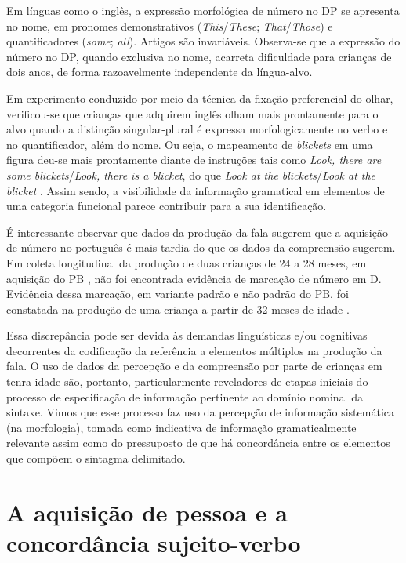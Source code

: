 \documentclass[output=paper]{LSP/langsci}
\begin{document}
Em línguas como o inglês, a expressão morfológica de número no DP se apresenta no nome, em pronomes demonstrativos (\textit{This}/\textit{These}; \textit{That}/\textit{Those}) e quantificadores (\textit{some}; \textit{all}). Artigos são invariáveis.  Observa-se que a expressão do número no DP, quando exclusiva no nome, acarreta dificuldade para crianças de dois anos, de forma razoavelmente independente da língua-alvo. 

Em experimento conduzido por meio da técnica da fixação preferencial do olhar, verificou-se que crianças que adquirem inglês olham mais prontamente para o alvo quando a distinção singular-plural é expressa morfologicamente no verbo e no quantificador, além do nome. Ou seja, o mapeamento de \textit{blickets} em uma figura deu-se mais prontamente diante de instruções tais como \textit{Look, there are some blickets}/\textit{Look, there is a blicket}, do que \textit{Look at the blickets}/\textit{Look at the blicket} \citep{kouider_etal2006}. Assim sendo, a visibilidade da informação gramatical em elementos de uma categoria funcional parece contribuir para a sua identificação. 

É interessante observar que dados da produção da fala sugerem que a aquisição de número no português é mais tardia do que os dados da compreensão sugerem. Em coleta longitudinal da produção de duas crianças de 24 a 28 meses, em aquisição do PB \citep{ferrarineto2003}, não foi encontrada evidência de marcação de número em D. Evidência dessa marcação, em variante padrão e não padrão do PB, foi constatada na produção de uma criança a partir de 32 meses de idade \citep{simioni2006}.

Essa discrepância pode ser devida às demandas linguísticas e/ou cognitivas decorrentes da codificação da referência a elementos múltiplos na produção da fala. O uso de dados da percepção e da compreensão por parte de crianças em tenra idade são, portanto, particularmente reveladores de etapas iniciais do processo de especificação de informação pertinente ao domínio nominal da sintaxe.  Vimos que esse processo faz uso da percepção de informação sistemática (na morfologia), tomada como indicativa de informação gramaticalmente relevante assim como do pressuposto de que há concordância entre os elementos que compõem o sintagma delimitado. 

\section{A aquisição de pessoa e a concordância sujeito-verbo}
\end{document}
